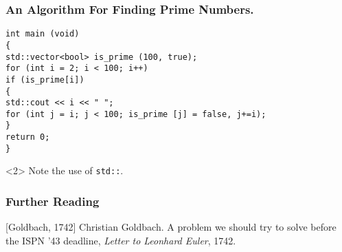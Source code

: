 \begin{frame}[fragile]
\frametitle{An Algorithm For Finding Prime Numbers.}
\tiny
\begin{verbatim}
int main (void)
{
std::vector<bool> is_prime (100, true);
for (int i = 2; i < 100; i++)
if (is_prime[i])
{
std::cout << i << " ";
for (int j = i; j < 100; is_prime [j] = false, j+=i);
}
return 0;
}
\end{verbatim}
\begin{uncoverenv}<2>
Note the use of \verb|std::|.
\end{uncoverenv}
\end{frame}

\begin{frame}
\frametitle{Further Reading}
\begin{thebibliography}{10}
[Goldbach, 1742]
Christian Goldbach.
\newblock A problem we should try to solve before the ISPN '43 deadline,
\newblock \emph{Letter to Leonhard Euler}, 1742.
\end{thebibliography}
\end{frame}
